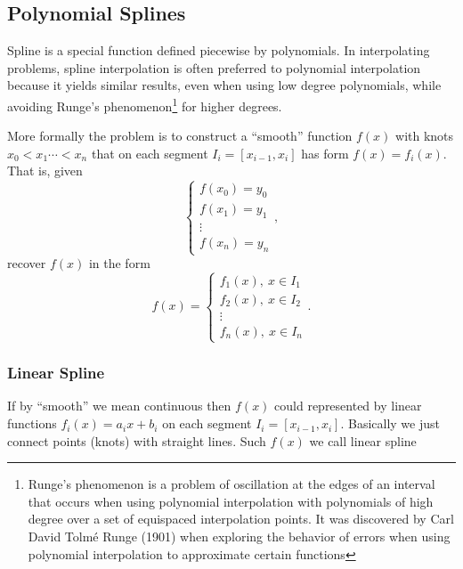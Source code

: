 \subsection*{Polynomial Splines}
Spline is a special function defined piecewise by polynomials. In interpolating problems, spline interpolation is often preferred to polynomial interpolation because it yields similar results, even when using low degree polynomials, while avoiding Runge's phenomenon\footnote{Runge's phenomenon is a problem of oscillation at the edges of an interval that occurs when using polynomial interpolation with polynomials of high degree over a set of equispaced interpolation points. It was discovered by Carl David Tolmé Runge (1901) when exploring the behavior of errors when using polynomial interpolation to approximate certain functions} for higher degrees.

More formally the problem is to construct a ``smooth'' function $f(x)$ with knots $x_0<x_1\cdots<x_n$ that on each segment $I_i = [x_{i-1}, x_i]$ has form $f(x) = f_i(x)$. That is, given
\[
    \left\{ 
    \begin{array}{c}
        f(x_0)=y_0\\
        f(x_1)=y_1\\
        \vdots \\
        f(x_n)=y_n
    \end{array}  
    \right.,
\]
recover $f(x)$ in the form
\[
    f(x) = 
    \left\{ 
    \begin{array}{c}
        f_1(x), \ x \in I_1\\
        f_2(x), \ x \in I_2\\
        \vdots \\
        f_n(x), \ x \in I_n
    \end{array}  
    \right..
\]

\subsubsection*{Linear Spline}
If by ``smooth'' we mean continuous then $f(x)$ could represented by linear functions $f_i(x)=a_ix+b_i$ on each segment $I_i = [x_{i-1}, x_i]$. Basically we just connect points (knots) with straight lines. Such $f(x)$ we call linear spline

